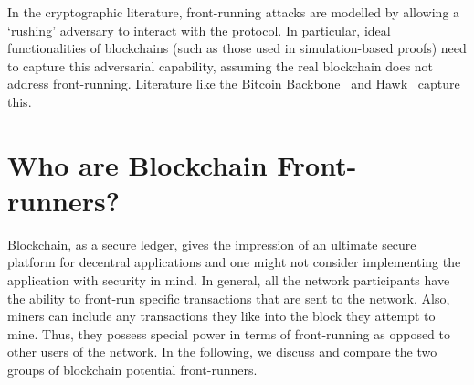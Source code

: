 In the cryptographic literature, front-running attacks are modelled by allowing a `rushing' adversary to interact with the protocol. In particular, ideal functionalities of blockchains (such as those used in simulation-based proofs) need to capture this adversarial capability, assuming the real blockchain does not address front-running. Literature like the Bitcoin Backbone~\cite{} and Hawk~\cite{} capture this. 



\section{Who are Blockchain Front-runners?} %
\label{sec:who can front-run?}

Blockchain, as a secure ledger, gives the impression of an ultimate secure platform for decentral applications and one might not consider implementing the application with security in mind. In general, all the network participants have the ability to front-run specific transactions that are sent to the network. Also, miners can include any transactions they like into the block they attempt to mine. Thus, they possess special power in terms of front-running as opposed to other users of the network. In the following, we discuss and compare the two groups of blockchain potential front-runners.

